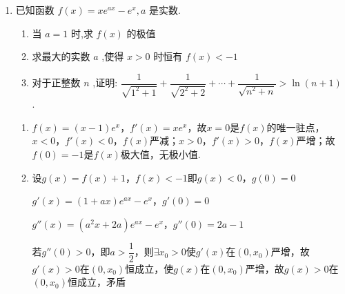\begin{enumerate}
\begin{enumerate}
\begin{jieda}
\begin{enumerate}
                令 $x = \dfrac{1}{n}$ ,则 $2\ln \left( {1 + \dfrac{1}{n}}\right)  < \dfrac{2}{n} + \dfrac{1}{{n}^{2}} = \dfrac{{2n} + 1}{{n}^{2}}$ ,
                所以 $2\ln \left( {1 + \dfrac{1}{1}}\right)  < \dfrac{2 \times  1 + 1}{{1}^{2}},2\ln \left( {1 + \dfrac{1}{2}}\right)  < \dfrac{2 \times  2 + 1}{{2}^{2}},2\ln \left( {1 + \dfrac{1}{3}}\right)  < \dfrac{2 \times  3 + 1}{{3}^{2}}$，$2\ln \left( {1 + \dfrac{1}{n}}\right)  < \dfrac{2 \times  n + 1}{{n}^{2}}$
                以上各式相加可得 $2\ln \left( {n + 1}\right)  < 3 + \dfrac{5}{4} + \dfrac{7}{9} + \cdots  + \dfrac{{2n} + 1}{{n}^{2}}$.

                \ps 根据切线不等式$ln(1+x) \leq x$可以证得$2\ln \left( {n + 1}\right) <2 + \dfrac{4}{4} + \dfrac{6}{9} + \cdots  + \dfrac{{2n}}{{n}^{2}} < 3 + \dfrac{5}{4} + \dfrac{7}{9} + \cdots  + \dfrac{{2n} + 1}{{n}^{2}}$.
            \end{enumerate}
        \end{jieda}
        \item 已知函数 $f\left( x\right)  = x{e}^{ax} - {e}^{x},a$ 是实数.
        \begin{enumerate}
            \item 当 $a = 1$ 时,求 $f\left( x\right)$ 的极值
            \item 求最大的实数 $a$ ,使得 $x > 0$ 时恒有 $f\left( x\right)  <  - 1$
            \item 对于正整数 $n$ ,证明: $\dfrac{1}{\sqrt{{1}^{2} + 1}} + \dfrac{1}{\sqrt{{2}^{2} + 2}} + \cdots  + \dfrac{1}{\sqrt{{n}^{2} + n}} > \ln \left( {n + 1}\right)$ .
        \end{enumerate}
        \begin{jieda}
            \begin{enumerate}
                \item $f\left( x\right) = (x-1)e^x$，$f'(x) = xe^x$，故$x = 0$是$f(x)$的唯一驻点，$x < 0$，$f'(x) < 0$，$f(x)$严减；$x > 0$，$f'(x) > 0$，$f(x)$严增；故$f(0) = -1$是$f(x)$极大值，无极小值.
                \item 设$g(x) = f(x)+1$，$f\left( x\right)  <  - 1$即$g(x) < 0$，$g(0) = 0$

                $g'(x) = (1+ax)e^{ax} - e^x$，$g'(0) = 0$

                $g''(x) = (a^2x+2a)e^{ax} - e^x$，$g''(0) = 2a-1$

                若$g''(0) > 0$，即$a > \dfrac{1}{2}$，则$\exists x_0 > 0$使$g'(x)$在$(0, x_0)$严增，故$g'(x) > 0$在$(0, x_0)$恒成立，使$g(x)$在$(0, x_0)$严增，故$g(x) > 0$在$(0, x_0)$恒成立，矛盾


\end{enumerate}
\end{jieda}
\end{enumerate}
\end{enumerate}
